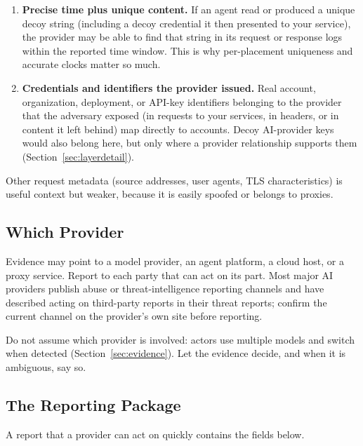 \documentclass[11pt,letterpaper]{article}
\begin{document}
\begin{enumerate}
  \item \textbf{Precise time plus unique content.} If an agent read or produced a unique decoy string (including a decoy credential it then presented to your service), the provider may be able to find that string in its request or response logs within the reported time window. This is why per-placement uniqueness and accurate clocks matter so much.
  \item \textbf{Credentials and identifiers the provider issued.} Real account, organization, deployment, or API-key identifiers belonging to the provider that the adversary exposed (in requests to your services, in headers, or in content it left behind) map directly to accounts. Decoy AI-provider keys would also belong here, but only where a provider relationship supports them (Section~\ref{sec:layerdetail}).
\end{enumerate}

Other request metadata (source addresses, user agents, TLS characteristics) is useful context but weaker, because it is easily spoofed or belongs to proxies.

\subsection{Which Provider}
\label{sec:whichprovider}

Evidence may point to a model provider, an agent platform, a cloud host, or a proxy service. Report to each party that can act on its part. Most major AI providers publish abuse or threat-intelligence reporting channels and have described acting on third-party reports in their threat reports; confirm the current channel on the provider's own site before reporting.

Do not assume which provider is involved: actors use multiple models and switch when detected (Section~\ref{sec:evidence}). Let the evidence decide, and when it is ambiguous, say so.

\subsection{The Reporting Package}
\label{sec:package}

A report that a provider can act on quickly contains the fields below.
\end{document}
